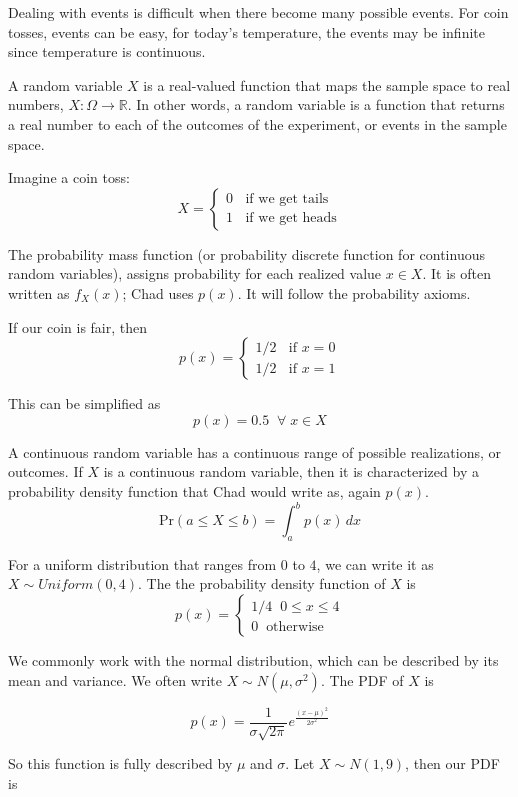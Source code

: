 \documentclass{article} %
\newcommand*\red{\color{red}}  %
\begin{document}
Dealing with events is difficult when there become many possible events. For coin tosses, events can be easy, for today's temperature, the events may be infinite since temperature is continuous. 

A {\red random variable} $X$ is a real-valued function that maps the sample space to real numbers, $X : \Omega \rightarrow \mathbb{R}$. In other words, a random variable is a function that returns a real number to each of the outcomes of the experiment, or events in the sample space.

Imagine a coin toss:
\[
X = \begin{cases}
	0 \;\; \text{ if we get tails} \\
	1 \;\; \text{ if we get heads}
\end{cases}
\]

The {\red probability mass function} (or probability discrete function for continuous random variables), assigns probability for each realized value $x \in X$. It is often written as $f_X(x)$; Chad uses $p(x)$. It will follow the probability axioms.

If our coin is fair, then
\[
p(x) = \begin{cases}
1/2 \;\; \text{ if } x = 0 \\
1/2 \;\; \text{ if } x = 1
\end{cases}
\]

This can be simplified as 
\[
p(x) = 0.5 \;\; \forall \; x \in X
\]

A {\red continuous random variable} has a continuous range of possible realizations, or outcomes. If $X$ is a continuous random variable, then it is characterized by a {\red probability density function} that Chad would write as, again $p(x)$.
\[
\text{Pr}(a \leq X \leq b) =  \int_a^b p(x) \, dx
\] 

For a uniform distribution that ranges from $0$ to $4$, we can write it as $X \sim Uniform(0, 4)$. The the probability density function of $X$ is
\[
p(x) = \begin{cases}
1/4 \;\; 0 \leq x \leq 4 \\
0 \;\; \text{otherwise}
\end{cases}
\] 

We commonly work with the normal distribution, which can be described by its mean and variance. We often write $X \sim N(\mu, \sigma^2)$. The PDF of $X$ is

\[
p(x) = \frac{1}{\sigma \sqrt{2\pi}} e^{\frac{(x - \mu)^2}{2\sigma^2}}
\]

So this function is fully described by $\mu$ and $\sigma$. Let $X \sim N(1, 9)$, then our PDF is
\end{document}
